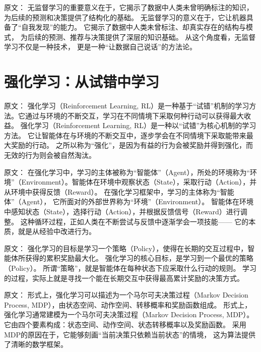 原文：
无监督学习的重要意义在于，它揭示了数据中人类未曾明确标注的知识，为后续的预测和决策提供了结构化的基础。
无监督学习的意义在于，它让机器具备了“自我发现”的能力。  
它揭示了数据中人类未曾标注、却真实存在的结构与模式，  
为后续的预测、推荐与决策提供了深层的知识基础。  
从这个角度看，无监督学习不仅是一种技术，  
更是一种“让数据自己说话”的方法论。

\section{强化学习：从试错中学习}

原文：
强化学习（Reinforcement Learning, RL）是一种基于“试错”机制的学习方法。它通过与环境的不断交互，学习在不同情境下采取何种行动可以获得最大收益。
强化学习（Reinforcement Learning, RL）是一种以“试错”为核心机制的学习方法。  
它让智能体在与环境的不断交互中，逐步学会在不同情境下采取能带来最大奖励的行动。  
之所以称为“强化”，是因为有益的行为会被奖励并得到强化，而无效的行为则会被自然淘汰。



原文：
在强化学习中，学习的主体被称为“智能体”（Agent），所处的环境称为“环境”（Environment）。智能体在环境中观察状态（State），采取行动（Action），并从环境中获得反馈（Reward）。
在强化学习框架中，学习的主体称为“智能体”（Agent），  
它所面对的外部世界称为“环境”（Environment）。  
智能体在环境中感知状态（State），选择行动（Action），并根据反馈信号（Reward）进行调整。  
这种循环过程，正如人类在不断尝试与反馈中逐渐学会一项技能——  
它的本质，就是从经验中改进行为。



原文：
强化学习的目标是学习一个策略（Policy），使得在长期的交互过程中，智能体所获得的累积奖励最大化。
强化学习的核心目标，是学习到一个最优的策略（Policy）。  
所谓“策略”，就是智能体在每种状态下应采取什么行动的规则。  
学习的过程，实际上就是寻找一个能在长期交互中获得最高累计奖励的决策方式。



原文：
形式上，强化学习可以描述为一个马尔可夫决策过程（Markov Decision Process, MDP），由状态空间、动作空间、转移概率和奖励函数组成。
形式上，强化学习通常建模为一个马尔可夫决策过程（Markov Decision Process, MDP）。  
它由四个要素构成：状态空间、动作空间、状态转移概率以及奖励函数。  
采用MDP的原因在于，它能够刻画“当前决策只依赖当前状态”的情境，  
这为算法提供了清晰的数学框架。



